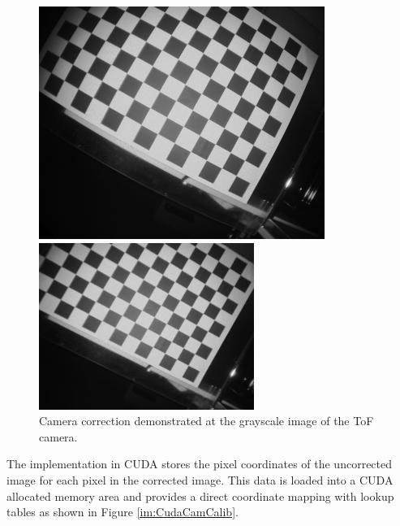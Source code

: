 \begin{figure}[H]
    \centering
    \begin{minipage}[b]{0.45\textwidth}
      \includegraphics[scale=0.70]{images/camcalib_source.jpg}
    \end{minipage} %
    \begin{minipage}[b]{0.45\textwidth}
      \includegraphics[scale=0.70]{images/camcalib_result.png} 
    \end{minipage}
    \caption{Camera correction demonstrated at the grayscale image of the ToF camera.}
    \label{fig.camCalib}
  \end{figure}
The implementation in CUDA stores the pixel coordinates of the uncorrected image for each pixel in the corrected image. This data is loaded into a CUDA allocated memory area and provides a direct coordinate mapping with lookup tables as shown in Figure \ref{im:CudaCamCalib}.
